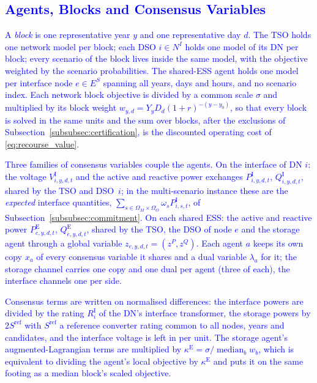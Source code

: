 \documentclass[preprint,12pt]{elsarticle}
\begin{document}
\subsection{\textcolor{blue}{Agents, Blocks and Consensus Variables}}
\label{app:admm_updated_agents}

\textcolor{blue}{
    A \emph{block} is one representative year $y$ and one representative day $d$. The TSO holds one network model per block; each DSO $i \in N^I$ holds one model of its DN per block; every scenario of the block lives inside the same model, with the objective weighted by the scenario probabilities. The shared-ESS agent holds one model per interface node $e \in E^S$ spanning all years, days and hours, and no scenario index. Each network block objective is divided by a common scale $\sigma$ and multiplied by its block weight $w_{y,d} = Y_y D_d (1+r)^{-(y-y_0)}$, so that every block is solved in the same units and the sum over blocks, after the exclusions of Subsection~\ref{subsubsec:certification}, is the discounted operating cost of \eqref{eq:recourse_value}.
}

\textcolor{blue}{
    Three families of consensus variables couple the agents. On the interface of DN $i$: the voltage $V^{\text{I}}_{i,y,d,t}$ and the active and reactive power exchanges $P^{\text{I}}_{i,y,d,t}$, $Q^{\text{I}}_{i,y,d,t}$, shared by the TSO and DSO~$i$; in the multi-scenario instance these are the \emph{expected} interface quantities, $\sum_{s \in \Omega_M \times \Omega_O} \omega_s P^{\text{I}}_{i,s,t}$, of Subsection~\ref{subsubsec:commitment}. On each shared ESS: the active and reactive power $P^{\text{E}}_{e,y,d,t}$, $Q^{\text{E}}_{e,y,d,t}$, shared by the TSO, the DSO of node $e$ and the storage agent through a global variable $z_{e,y,d,t} = (z^{P}, z^{Q})$. Each agent $a$ keeps its own copy $x_a$ of every consensus variable it shares and a dual variable $\lambda_a$ for it; the storage channel carries one copy and one dual per agent (three of each), the interface channels one per side.
}

\textcolor{blue}{
    Consensus terms are written on normalised differences: the interface powers are divided by the rating $R^{\text{I}}_i$ of the DN's interface transformer, the storage powers by $2 S^{\text{ref}}$ with $S^{\text{ref}}$ a reference converter rating common to all nodes, years and candidates, and the interface voltage is left in per unit.
    The storage agent's augmented-Lagrangian terms are multiplied by $\kappa^{\text{E}} = \sigma / \operatorname{median}_b w_b$, which is equivalent to dividing the agent's local objective by $\kappa^{\text{E}}$ and puts it on the same footing as a median block's scaled objective.
}
\end{document}
